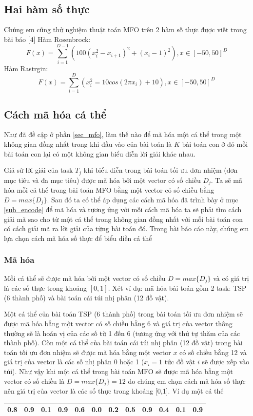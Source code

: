 \documentclass[a4paper,12pt]{report}
\begin{document}
\subsection{Hai hàm số thực} 
Chúng em cũng thử nghiệm thuật toán MFO trên 2 hàm số thực được viết trong bài báo [4]
Hàm Rosenbrock: 
$$F(x)=\sum_{i=1}^{D-1}(100(x_i^2-x_{i+1})^2+(x_i-1)^2),x \in [-50,50]^D $$
Hàm Rastrgin:
$$F(x)=\sum_{i=1}^D(x_i^2=10cos(2\pi x_i)+10),x \in [-50,50]^D$$

\subsection{Cách mã hóa cá thể}
Như đã đề cập ở phần \ref{sec_mfo}, làm thế nào để mã hóa một cá thể trong một không gian đồng nhất trong khi đầu vào của bài toán là $K$ bài toán con ở đó mỗi bài toán con lại có một không gian biểu diễn lời giải khác nhau.
\par Giả sử lời giải của task $T_j$ khi biểu diễn trong bài toán tối ưu đơn nhiệm (đơn mục tiêu và đa mục tiêu) được mã hóa bởi một vector có số chiều $D_j$. Ta sẽ mã hóa mỗi cá thể trong bài toán MFO bằng một vector có số chiều bằng $D = max\{D_j\}$. Sau đó ta có thể áp dụng các cách mã hóa đã trình bày ở mục \ref{sub_encode}  để mã hóa và tương ứng với mỗi cách mã hóa ta sẽ phải tìm cách giải mã sao cho từ một cá thể trong không gian đồng nhất với mỗi bài toán con có cách giải mã ra lời giải của từng bài toán đó. Trong bài báo cáo này, chúng em lựa chọn cách mã hóa số thực để biểu diễn cá thể
\subsubsection{Mã hóa}
Mỗi cá thể sẽ được mã hóa bởi một vector có số chiều $D = max\{D_j\}$ và có giá trị là các số thực trong khoảng $[0,1]$. Xét ví dụ: mã hóa bài toán gồm 2 task: TSP (6 thành phố) và bài toán cái túi nhị phân (12 đồ vật).
\par Một cá thể của bài toán TSP (6 thành phố) trong bài toán tối ưu đơn nhiệm sẽ được mã hóa bằng một vector có số chiều bằng 6 và giá trị của vector thông thường sẽ là hoán vị của các số từ 1 đến 6 (tương ứng với thứ tự thăm của các thành phố). Còn một cá thể của bài toán cái túi nhị phân (12 đồ vật) trong bài toán tối ưu đơn nhiệm sẽ được mã hóa bằng một vector $x$ có số chiều bằng 12 và giá trị của vector là các số nhị phân 0 hoặc 1 ($x_i=1$ tức đồ vật $i$ sẽ được xếp vào túi). Như vậy khi một cá thể trong bài toán MFO sẽ được mã hóa bằng một vector có số chiều là $D = max\{D_j\} = 12$ do chúng em chọn cách mã hóa số thực nên giá trị của vector là các số thực trong khoảng [0,1]. Ví dụ một cá thể \cite{MFO-slide}
\begin{longtable}{|c|c|c|c|c|c|c|c|c|c|c|c|}
\hline
0.8 & 0.9 & 0.1 & 0.9 & 0.6 & 0.0 & 0.2 & 0.5 & 0.9 & 0.4 & 0.1 & 0.9\\
\hline
\end{longtable}
\end{document}
